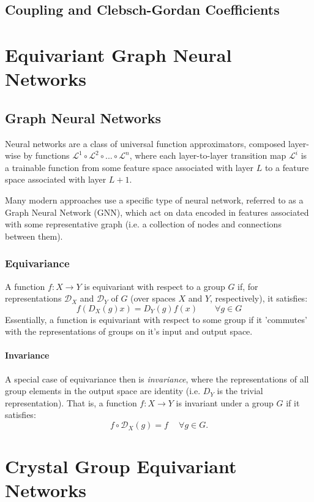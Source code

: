 \documentclass[]{report}
\begin{document}
\section{Coupling and Clebsch-Gordan Coefficients}


\chapter{Equivariant Graph Neural Networks}


\section{Graph Neural Networks}
Neural networks are a class of universal function approximators, composed layer-wise by functions $\mathcal{L}^1\circ\mathcal{L}^2\circ ... \circ \mathcal{L}^n $, where each layer-to-layer transition map $\mathcal{L}^i$ is a trainable function from some feature space associated with layer $L$ to a feature space associated with layer $L+1$.

Many modern approaches use a specific type of neural network, referred to as a Graph Neural Network (GNN), which act on data encoded in features associated with some representative graph (i.e. a collection of nodes and connections between them).


\subsection{Equivariance}
A function $f:X\rightarrow Y$ is equivariant with respect to a group $G$ if, for representations $\mathcal{D}_X$ and $\mathcal{D}_Y$ of $G$ (over spaces $X$ and $Y$, respectively), it satisfies:
$$
f(D_X(g)x) = D_Y(g)f(x) \quad\quad \forall g\in G
$$
Essentially, a function is equivariant with respect to some group if it 'commutes' with the representations of groups on it's input and output space. 

\subsubsection*{Invariance}
A special case of equivariance then is \textit{invariance}, where the representations of all group elements in the output space are identity (i.e. $D_Y$ is the trivial representation). That is, a function $f:X\rightarrow Y$ is invariant under a group $G$ if it satisfies:
$$
f\circ \mathcal{D}_X(g) = f \quad
\ \forall g\in G.
$$



\chapter{Crystal Group Equivariant Networks}

\medskip
\end{document}
